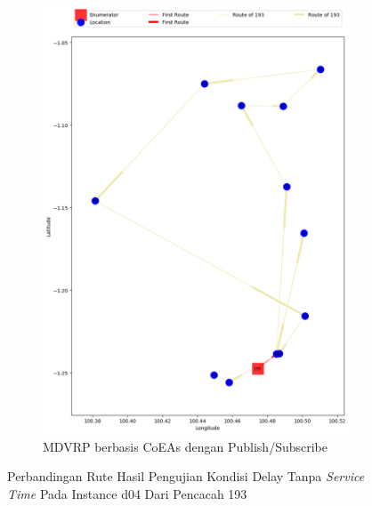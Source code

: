 \begin{figure}[H]\ContinuedFloat
	\centering
	\begin{subfigure}[t]{\textwidth}
		\centering
		\includegraphics[width=\textwidth]{Resources/Images/delayed_4/real_m15_n100_delayed_4_193_pubsub_coes}
		\caption{MDVRP berbasis CoEAs dengan Publish/Subscribe}
		\label{fig:real_m15_n100_delayed_4_193_pubsub_coes}
	\end{subfigure}
	\caption{Perbandingan Rute Hasil Pengujian Kondisi Delay Tanpa \textit{Service Time} Pada Instance d04 Dari Pencacah 193}
	\label{fig:real_m15_n100_delayed_4_193_contd}
\end{figure}


